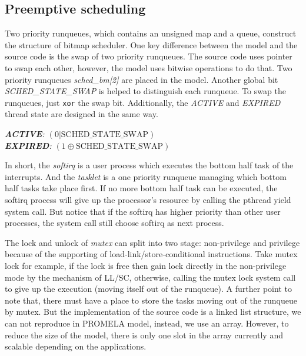 \subsection{Preemptive scheduling}
Two priority runqueues, which contains an unsigned map and a queue, construct the structure of bitmap scheduler. One key difference between the model and the source code is the swap of two priority runqueues. The source code uses pointer to swap each other, however, the model uses bitwise operations to do that. Two priority runqueues \textit{sched\_bm[2]} are placed in the model. Another global bit \textit{SCHED\_STATE\_SWAP} is helped to distinguish each runqueue. To swap the runqueues, just \texttt{xor} the swap bit. Additionally, the \textit{ACTIVE} and \textit{EXPIRED} thread state are designed in the same way.

{\medbreak\indent\textit{\textbf{ACTIVE}: $(0 | \text{SCHED\_STATE\_SWAP})$}}
{\\\indent\textit{\textbf{EXPIRED}: $(1 \oplus \text{SCHED\_STATE\_SWAP})$}}
\medbreak

In short, the \textit{softirq} is a user process which executes the bottom half task of the interrupts. And the \textit{tasklet} is a one priority runqueue managing which bottom half tasks take place first. If no more bottom half task can be executed, the softirq process will give up the processor's resource by calling the pthread yield system call. But notice that if the softirq has higher priority than other user processes, the system call still choose softirq as next process.

The lock and unlock of \textit{mutex} can split into two stage: non-privilege and privilege because of the supporting of load-link/store-conditional instructions. Take mutex lock for example, if the lock is free then gain lock directly in the non-privilege mode by the mechanism of LL/SC, otherwise, calling the mutex lock system call to give up the execution (moving itself out of the runqueue). A further point to note that, there must have a place to store the tasks moving out of the runqueue by mutex. But the implementation of the source code is a linked list structure, we can not reproduce in PROMELA model, instead, we use an array. However, to reduce the size of the model, there is only one slot in the array currently and scalable depending on the applications.

